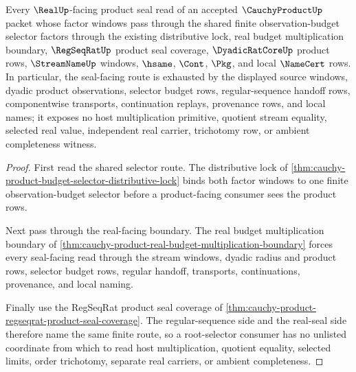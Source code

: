\begin{theorem}
\label{thm:cauchy-product-root-selector-real-seal-exhaustion}
Every $\RealUp$-facing product seal read of an accepted $\CauchyProductUp$ packet whose factor windows pass through the shared finite observation-budget selector factors through the existing distributive lock, real budget multiplication boundary, $\RegSeqRatUp$ product seal coverage, $\DyadicRatCoreUp$ product rows, $\StreamNameUp$ windows, $\hsame$, $\Cont$, $\Pkg$, and local $\NameCert$ rows. In particular, the seal-facing route is exhausted by the displayed source windows, dyadic product observations, selector budget rows, regular-sequence handoff rows, componentwise transports, continuation replays, provenance rows, and local names; it exposes no host multiplication primitive, quotient stream equality, selected real value, independent real carrier, trichotomy row, or ambient completeness witness.
\end{theorem}
\begin{proof}
First read the shared selector route. The distributive lock of \autoref{thm:cauchy-product-budget-selector-distributive-lock} binds both factor windows to one finite observation-budget selector before a product-facing consumer sees the product rows.

Next pass through the real-facing boundary. The real budget multiplication boundary of \autoref{thm:cauchy-product-real-budget-multiplication-boundary} forces every seal-facing read through the stream windows, dyadic radius and product rows, selector budget rows, regular handoff, transports, continuations, provenance, and local naming.

Finally use the RegSeqRat product seal coverage of \autoref{thm:cauchy-product-regseqrat-product-seal-coverage}. The regular-sequence side and the real-seal side therefore name the same finite route, so a root-selector consumer has no unlisted coordinate from which to read host multiplication, quotient equality, selected limits, order trichotomy, separate real carriers, or ambient completeness.
\end{proof}

